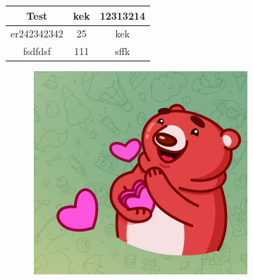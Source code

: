 \documentclass{article}
\begin{document}
\begin{tabular}{|c|c|c|}
\hline
Test & kek & 12313214 \\
\hline
er242342342 & 25 & kek \\
\hline
fsdfdsf & 111 & sffk \\
\hline
\end{tabular}\begin{figure}[h!]
\centering
\includegraphics{pic.png}
\end{figure}
\end{document}
